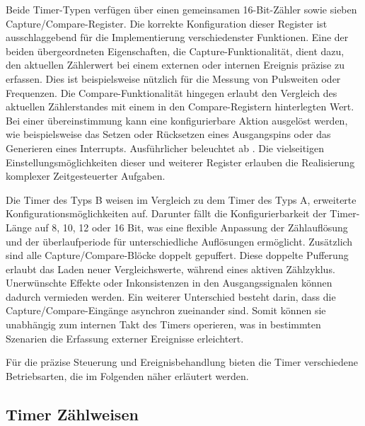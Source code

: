 \newpage
Beide Timer-Typen verf\"ugen \"uber einen gemeinsamen 16-Bit-Z\"ahler sowie sieben Capture/Compare-Register. Die korrekte Konfiguration dieser Register ist ausschlaggebend f\"ur die Implementierung verschiedenster Funktionen. Eine der beiden \"ubergeordneten Eigenschaften, die Capture-Funktionalit\"at, dient dazu, den aktuellen Z\"ahlerwert bei einem externen oder internen Ereignis pr\"azise zu erfassen. Dies ist beispielsweise n\"utzlich f\"ur die Messung von Pulsweiten oder Frequenzen. Die Compare-Funktionalit\"at hingegen erlaubt den Vergleich des aktuellen Z\"ahlerstandes mit einem in den Compare-Registern hinterlegten Wert. Bei einer \"ubereinstimmung kann eine konfigurierbare Aktion ausgel\"ost werden, wie beispielsweise das Setzen oder R\"ucksetzen eines Ausgangspins oder das Generieren eines Interrupts. Ausf\"uhrlicher beleuchtet ab . Die vielseitigen Einstellungsm\"oglichkeiten dieser und weiterer Register erlauben die Realisierung komplexer Zeitgesteuerter Aufgaben.\\

Die Timer des Typs B weisen im Vergleich zu dem Timer des Typs A, erweiterte Konfigurationsm\"oglichkeiten auf. Darunter f\"allt die Konfigurierbarkeit der Timer-L\"ange auf 8, 10, 12 oder 16 Bit, was eine flexible Anpassung der Z\"ahlaufl\"osung und der \"uberlaufperiode f\"ur unterschiedliche Aufl\"osungen erm\"oglicht. Zus\"atzlich sind alle Capture/Compare-Bl\"ocke doppelt gepuffert. Diese doppelte Pufferung erlaubt das Laden neuer Vergleichswerte, w\"ahrend eines aktiven Z\"ahlzyklus. Unerw\"unschte Effekte oder Inkonsistenzen in den Ausgangssignalen k\"onnen dadurch vermieden werden. Ein weiterer Unterschied besteht darin, dass die Capture/Compare-Eing\"ange asynchron zueinander sind. Somit k\"onnen sie unabh\"angig zum internen Takt des Timers operieren, was in bestimmten Szenarien die Erfassung externer Ereignisse erleichtert. 

F\"ur die pr\"azise Steuerung und Ereignisbehandlung bieten die Timer verschiedene Betriebsarten, die im Folgenden n\"aher erl\"autert werden.

\newpage
\subsection{Timer Z\"ahlweisen}
\label{sec:Timer_CountMode}

